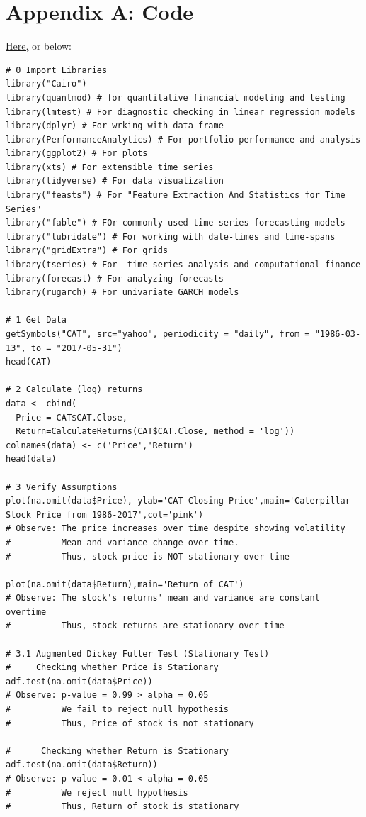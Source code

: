 \documentclass{article}
\begin{document}
\section{Appendix A: Code}
\href{https://github.com/mshki/math-456/blob/main/essay_6/main.R}{Here,} or below:
\begin{verbatim}
# 0 Import Libraries
library("Cairo")
library(quantmod) # for quantitative financial modeling and testing
library(lmtest) # For diagnostic checking in linear regression models
library(dplyr) # For wrking with data frame 
library(PerformanceAnalytics) # For portfolio performance and analysis
library(ggplot2) # For plots
library(xts) # For extensible time series
library(tidyverse) # For data visualization 
library("feasts") # For "Feature Extraction And Statistics for Time Series" 
library("fable") # FOr commonly used time series forecasting models
library("lubridate") # For working with date-times and time-spans
library("gridExtra") # For grids
library(tseries) # For  time series analysis and computational finance
library(forecast) # For analyzing forecasts 
library(rugarch) # For univariate GARCH models

# 1 Get Data
getSymbols("CAT", src="yahoo", periodicity = "daily", from = "1986-03-13", to = "2017-05-31")
head(CAT)

# 2 Calculate (log) returns
data <- cbind(
  Price = CAT$CAT.Close,
  Return=CalculateReturns(CAT$CAT.Close, method = 'log')) 
colnames(data) <- c('Price','Return')
head(data)

# 3 Verify Assumptions
plot(na.omit(data$Price), ylab='CAT Closing Price',main='Caterpillar Stock Price from 1986-2017',col='pink')
# Observe: The price increases over time despite showing volatility 
#          Mean and variance change over time.
#          Thus, stock price is NOT stationary over time

plot(na.omit(data$Return),main='Return of CAT')
# Observe: The stock's returns' mean and variance are constant overtime 
#          Thus, stock returns are stationary over time

# 3.1 Augmented Dickey Fuller Test (Stationary Test)
#     Checking whether Price is Stationary 
adf.test(na.omit(data$Price))
# Observe: p-value = 0.99 > alpha = 0.05
#          We fail to reject null hypothesis 
#          Thus, Price of stock is not stationary

#      Checking whether Return is Stationary 
adf.test(na.omit(data$Return))
# Observe: p-value = 0.01 < alpha = 0.05
#          We reject null hypothesis 
#          Thus, Return of stock is stationary


\end{verbatim}
\end{document}
